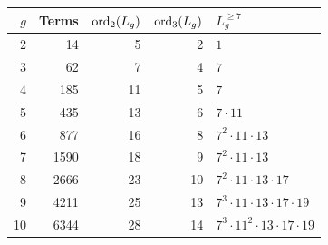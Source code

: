 \begin{tabular}{rrrrl}
\toprule $g$ & Terms & $\operatorname{ord}_2(L_g)$ & $\operatorname{ord}_3(L_g)$ & $L_g^{\ge7}$ \\
\midrule
2 & 14 & 5 & 2 & $1$ \\
3 & 62 & 7 & 4 & $7$ \\
4 & 185 & 11 & 5 & $7$ \\
5 & 435 & 13 & 6 & $7\cdot11$ \\
6 & 877 & 16 & 8 & $7^{2}\cdot11\cdot13$ \\
7 & 1590 & 18 & 9 & $7^{2}\cdot11\cdot13$ \\
8 & 2666 & 23 & 10 & $7^{2}\cdot11\cdot13\cdot17$ \\
9 & 4211 & 25 & 13 & $7^{3}\cdot11\cdot13\cdot17\cdot19$ \\
10 & 6344 & 28 & 14 & $7^{3}\cdot11^{2}\cdot13\cdot17\cdot19$ \\
\bottomrule
\end{tabular}

